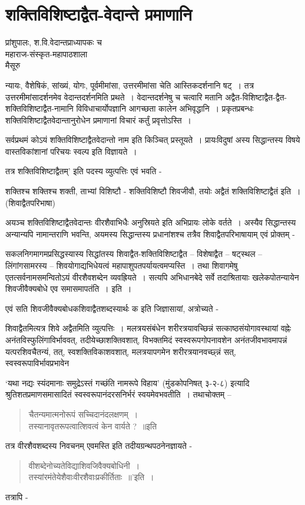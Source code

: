 {\fontsize{15}{17}\selectfont
\presetvalues
\chapter{शक्तिविशिष्टाद्वैत-वेदान्ते प्रमाणानि}

\begin{center}
\smallskip
प्रांशुपालः, श.वि.वेदान्तप्राध्यापकः च\\
महाराज-संस्कृत-महापाठशाला\\
मैसूरु
\addrule
\end{center}
न्यायः, वैशेषिकं, सांख्यं, योगः, पूर्वमीमांसा, उत्तरमीमांसा चेति आस्तिकदर्शनानि षट्~। तत्र उत्तरमीमांसादर्शनमेव वेदान्तदर्शनमिति प्रथते~। वेदान्तदर्शनेषु च चत्वारि मतानि अद्वैत-विशिष्टाद्वैत-द्वैत-शक्तिविशिष्टाद्वैत-नामानि विविधाचार्योपज्ञानि आगच्छता कालेन अभिवृद्धानि~। प्रकृतप्रबन्धः शक्तिविशिष्टाद्वैतवेदान्तानुरोधेन प्रमाणानां विचारं कर्तुं प्रवृत्तोऽस्ति~। 

सर्वप्रथमं कोऽयं शक्तिविशिष्टाद्वैतवेदान्तो नाम इति किञ्चित् प्रस्तूयते~। प्रायःविदुषां अस्य सिद्धान्तस्य विषये वास्तविकांशानां परिचयः स्वल्प इति विज्ञायते~। 

तत्र  शक्तिविशिष्टाद्वैतम्’ इति पदस्य व्युत्पत्तिः एवं भवति -

शक्तिश्च शक्तिश्च शक्ती, ताभ्यां विशिष्टौ -  शक्तिविशिष्टौ शिवजीवौ, तयोः अद्वैतं शक्तिविशिष्टाद्वैतं इति~। (शिवाद्वैतपरिभाषा)

अयञ्च शक्तिविशिष्टाद्वैतवेदान्तः वीरशैवाभिधैः अनुस्रियते इति अभिप्रायः लोके वर्तते~। अस्यैव सिद्धान्तस्य अन्यान्यपि नामान्तराणि भवन्ति, अयमस्य सिद्धान्तस्य प्रधानांशश्च तत्रैव शिवाद्वैतपरिभाषायाम् एवं प्रोक्तम् -

सकलनिगमागमप्रसिद्धस्यास्य सिद्धांतस्य शिवाद्वैत-शक्तिविशिष्टाद्वैत – विशेषाद्वैत – षट्स्थल – लिंगांगसामरस्य – शिवयोगाद्यभिधेयत्वं महापाशुपतपर्यायत्वमप्यस्ति~। तथा शिवागमेषु एतत्सर्वनामसमन्वितोऽयं वीरशैवशब्देन व्यवह्रियते~। सत्यपि अभिधानबेदे सर्वे तदाश्रितायाः खलेकपोतन्यायेन शिवजीवैक्यबोधे एव समासमापतंति~। इति~। 

एवं सति शिवजीवैक्यबोधकशिवाद्वैतशब्दस्यार्थः क  इति जिज्ञासायां, अत्रोच्यते -

शिवाद्वैतमित्यत्र शिवे अद्वैतमिति व्युत्पत्तिः~। मलत्रयसंबंधेन शरीरत्रयावच्छिन्नं सत्काष्ठसंयोगावस्थायां वह्नेः अनंतविस्फुलिंगाविर्भाववत्, तदीयेच्छाशक्तिवशात्, विभक्तमिदं स्वस्वरूपगोपनावशेन अनंतजीवभावमापन्नं यत्परशिवचैतन्यं, तत्, स्वशक्तिविकाशवशात्, मलत्रयापगमेन शरीरत्रयानवच्छ्न्नं सत्,  स्वस्वरूपाविर्भावप्रभावेन

‘यथा नद्यः स्यंदमानाः समुद्रेऽस्तं गच्छंति नामरूपे विहाय’ (मुंडकोपनिषत् ३-२-८)
इत्यादि श्रुतिशतप्रमाणसमासादितं स्वस्वरूपानंदरसनिर्भरं स्वयमेवभवतीति~। तथाचोक्तम् –
\begin{verse}
चैतन्यमात्मनोरूपं सच्चिदानंदलक्षणम्~। \\
तस्यानावृतरूपत्वात्शिवत्वं केन वार्यते ?~॥इति
\end{verse}
तत्र वीरशैवशब्दस्य निवचनम् एवमस्ति इति तदीयग्रन्थपठनेनज्ञायते -
\begin{verse}
वीशब्देनोच्यतेविद्याशिवजिवैक्यबोधिनी~। \\
तस्यांरमंतेयेशैवाःवीरशैवाःप्रकीर्तिताः~॥’इति~। 
\end{verse}
तत्रापि -

}
